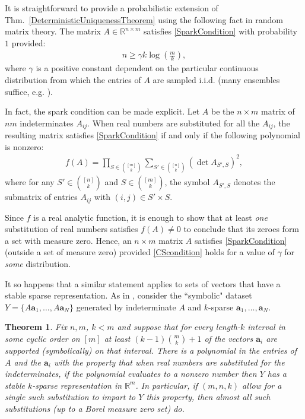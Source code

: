 \documentclass[journal, twocolumn]{IEEEtran}
\newtheorem{theorem}{Theorem}
\begin{document}
It is straightforward to provide a probabilistic extension of Thm.~\ref{DeterministicUniquenessTheorem} using the following fact in random matrix theory.  The matrix $A \in \mathbb{R}^{n \times m}$ satisfies \eqref{SparkCondition} with probability $1$
provided:
\begin{align}\label{CScondition}
n \geq \gamma k\log\left(\frac{m}{k}\right),
\end{align}
where $\gamma$ is a positive constant dependent on the particular continuous distribution from which the entries of $A$ are sampled i.i.d. (many ensembles suffice, e.g. \cite[Sec.~4]{Baraniuk08}). 

In fact, the spark condition can be made explicit.  Let $A$  be the $n \times m$ matrix of $nm$ indeterminates $A_{ij}$. When real numbers are substituted for all the $A_{ij}$, the resulting matrix satisfies \eqref{SparkCondition} if and only if the following polynomial is nonzero:
\begin{align*}
f(A) = \prod_{S \in {[m] \choose k}} \sum_{S' \in {[n] \choose k}} (\det A_{S',S})^2,
\end{align*}
%
where for any $S' \in {[n] \choose k}$ and $S \in {[m] \choose k}$, the symbol $A_{S',S}$ denotes the submatrix of entries $A_{ij}$ with $(i,j) \in S' \times S$. 

Since $f$ is a real analytic function, it is enough to show that at least \emph{one} substitution of real numbers satisfies $f(A) \neq 0$ to conclude that its zeroes form a set with measure zero. Hence, an $n \times m$ matrix $A$ satisfies \eqref{SparkCondition} (outside a set of measure zero) provided \eqref{CScondition} holds for a value of $\gamma$ for \emph{some}  distribution. 

It so happens that a similar statement applies to sets of vectors that have a stable sparse representation. As in \cite[Sec.~IV]{Hillar15}, consider the ``symbolic" dataset $Y = \{A\mathbf{a}_1,\ldots,A \mathbf{a}_N\}$ generated by indeterminate $A$ and $k$-sparse $\mathbf{a}_1, \ldots, \mathbf{a}_N$. 
\begin{theorem}\label{robustPolythm} 
Fix $n, m$, $k < m$ and suppose that for every length-$k$ interval in some cyclic order on $[m]$ at least \mbox{$(k-1){m \choose k}+1$} of the vectors $\mathbf{a}_i$ are supported (symbolically) on that interval. There is a polynomial in the entries of $A$ and the $\mathbf{a}_i$ with the property that when real numbers are substituted for the indeterminates, if the polynomial evaluates to a nonzero number then $Y$ has a stable $k$-sparse representation in $\mathbb{R}^m$. In particular, if $(m,n,k)$ allow for a single such substitution to impart to $Y$ this property, then almost all such substitutions (up to a Borel measure zero set) do.
\end{theorem}
\end{document}
